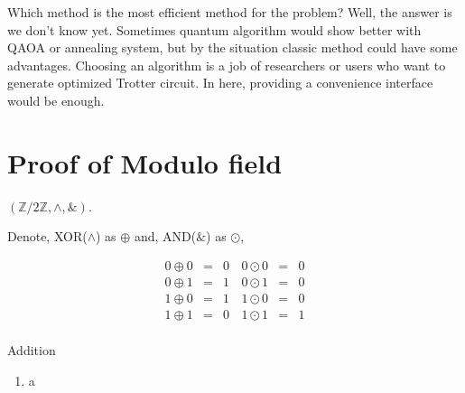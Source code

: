 \documentclass[a4paper,12pt]{article}
\begin{document}
Which method is the most efficient method for the problem? 
Well, the answer is we don't know yet. 
Sometimes quantum algorithm would show better with QAOA or annealing system,
but by the situation classic method could have some advantages.
Choosing an algorithm is a job of researchers or users who want to generate optimized 
Trotter circuit. In here, providing a convenience interface would be enough.

%

\appendix

\section{Proof of Modulo field}
\label{appendix:modulo_field}

$(\mathbb{Z}/2\mathbb{Z} ,\wedge , \&)$.

Denote, XOR($\wedge$) as $\oplus$ and, AND($\&$) as $\odot$,

\begin{equation}
    \begin{matrix}
        0 \oplus 0 & = &0\\
        0 \oplus 1 & = &1\\
        1 \oplus 0 & = &1\\
        1 \oplus 1 & = &0\\
    \end{matrix}
    \, 
    \begin{matrix}
        0 \odot 0 & = &0\\
        0 \odot 1 & = &0\\
        1 \odot 0 & = &0\\
        1 \odot 1 & = &1\\
    \end{matrix}
\end{equation}

Addition 

\begin{enumerate}
    \item a
\end{enumerate}

  
  
\end{document}
